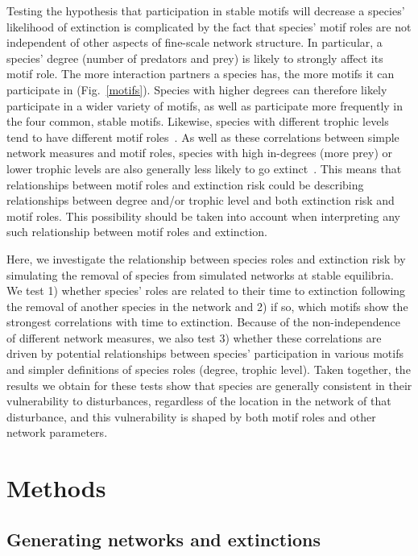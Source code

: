 \documentclass[12pt]{article}
\begin{document}
\begin{spacing}{1.0}
	Testing the hypothesis that participation in stable motifs will decrease a species' likelihood of extinction is complicated by the fact that species' motif roles are not independent of other aspects of fine-scale network structure. 
    In particular, a species' degree (number of predators and prey) is likely to strongly affect its motif role.
    The more interaction partners a species has, the more motifs it can participate in (Fig.~\ref{motifs}).
    Species with higher degrees can therefore likely participate in a wider variety of motifs, as well as participate more frequently in the four common, stable motifs.
    Likewise, species with different trophic levels tend to have different motif roles~\citep{Cirtwill2018EcolLett}.
    As well as these correlations between simple network measures and motif roles, species with high in-degrees (more prey) or lower trophic levels are also generally less likely to go extinct~\citep{Cirtwill2018FoodWebs}.
    This means that relationships between motif roles and extinction risk could be describing relationships between degree and/or trophic level and both extinction risk and motif roles.
    This possibility should be taken into account when interpreting any such relationship between motif roles and extinction.
    
    
    Here, we investigate the relationship between species roles and extinction risk by simulating the removal of species from simulated networks at stable equilibria. We test 1) whether species' roles are related to their time to extinction following the removal of another species in the network and 2) if so, which motifs show the strongest correlations with time to extinction.
    Because of the non-independence of different network measures, we also test 3) whether these correlations are driven by potential relationships between species' participation in various motifs and simpler definitions of species roles (degree, trophic level). Taken together, the results we obtain for these tests show that species are generally consistent in their vulnerability to disturbances, regardless of the location in the network of that disturbance, and this vulnerability is shaped by both motif roles and other network parameters.


\section*{Methods}

    \subsection*{Generating networks and extinctions}


\end{spacing}
\end{document}
